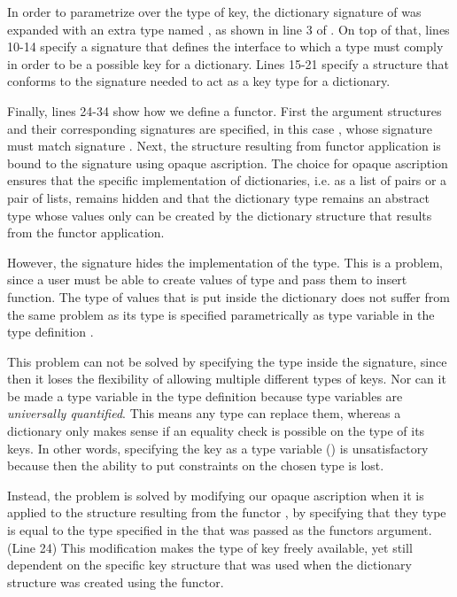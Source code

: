 \documentclass[10pt,a4paper,master=cws, masteroption=ai,english,inputenc=utf8]{kulemt}
\begin{document}
In order to parametrize over the type of key, the dictionary signature of  was expanded with an extra type named , as shown in line 3 of .
On top of that, lines 10-14 specify a signature  that defines the interface to which a type must comply in order to be a possible key for a dictionary.
Lines 15-21 specify a structure  that conforms to the signature needed to act as a key type for a dictionary.

Finally, lines 24-34 show how we define a functor.
First the argument structures and their corresponding signatures are specified, in this case , whose signature must match signature .
Next, the structure resulting from functor application is bound to the  signature using opaque ascription.
The choice for opaque ascription ensures that the specific implementation of dictionaries, i.e. as a list of pairs or a pair of lists, remains hidden and that the dictionary type remains an abstract type whose values only can be created by the dictionary structure that results from the functor application.

However, the signature  hides the implementation of the  type.
This is a problem, since a user must be able to create values of type  and pass them to insert function.
The type of values that is put inside the dictionary does not suffer from the same problem as its type is specified parametrically as type variable  in the type definition .

This problem can not be solved by specifying the type inside the  signature, since then it loses the flexibility of allowing multiple different types of keys.
Nor can it be made a type variable in the type definition  because type variables are \emph{universally quantified}. 
This means any type can replace them, whereas a dictionary only makes sense if an equality check is possible on the type of its keys.
In other words, specifying the key as a type variable () is unsatisfactory because then the ability to put constraints on the chosen type is lost.

Instead, the problem is solved by modifying our opaque ascription when it is applied to the structure resulting from the functor , by specifying that they  type is equal to the type  specified in the  that was passed as the functors argument. (Line 24)
This modification makes the type of key freely available, yet still dependent on the specific key structure that was used when the dictionary structure was created using the functor.
\end{document}
